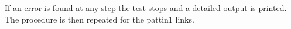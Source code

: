 If an error is found at any step the test stops and a detailed output is printed. The procedure is then repeated for the pattin1 links.

















